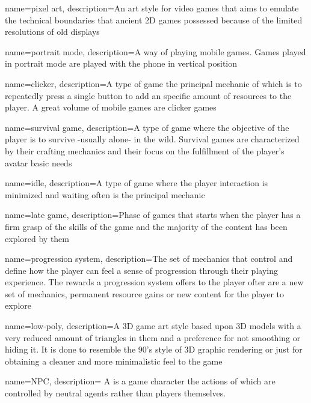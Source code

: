 \makeglossaries

{
	name=pixel art,
		description={An art style for video games that aims to emulate the technical boundaries that ancient 2D games possessed because of the limited resolutions of old displays}
}

{
	name=portrait mode,
		description={A way of playing mobile games. Games played in portrait mode are played  with the phone in vertical position}
}

{
	name=clicker,
		description={A type of game the principal mechanic of which is to repeatedly press a single button to add an specific amount of resources to the player. A great volume of mobile games are clicker games}
}


{
	name=survival game,
		description={A type of game where the objective of the player is to survive -usually alone- in the wild. Survival games are characterized by their crafting mechanics and their focus on the fulfillment of the player's avatar basic needs}
}

{
	name=idle,
		description={A type of game where the player interaction is minimized and waiting often is the principal mechanic}
}

{
	name=late game,
		description={Phase of games that starts when the player has a firm grasp of the skills of the game and the majority of the content has been explored by them}
}

{
	name=progression system,
		description={The set of mechanics that control and define how the player can feel a sense of progression through their playing experience. The rewards a progression system offers to the player ofter are a new set of mechanics, permanent resource gains or new content for the player to explore}
}

{
	name=low-poly,
		description={A 3D game art style based upon 3D models with a very reduced amount of triangles in them and a preference for not smoothing or hiding it. It is done to resemble the 90's style of 3D graphic rendering or just for obtaining a cleaner and more minimalistic feel to the game}
}

{
	name={NPC},
		description={
			A  is a game character the actions of which are
				controlled by neutral agents rather than players themselves.
		}
}


